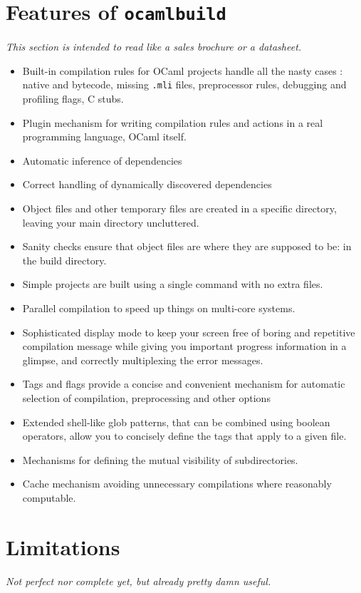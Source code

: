 \documentclass[12pt]{article}
\newcommand{\ocb}{\texttt{ocamlbuild}~}
\begin{document}
\section{Features of \ocb}
{\em This section is intended to read like a sales brochure or a datasheet.}

\begin{itemize}
\item Built-in compilation rules for OCaml projects handle all the nasty cases : native and bytecode,
missing \texttt{.mli} files, preprocessor rules, debugging and profiling flags, C stubs.
\item Plugin mechanism for writing compilation rules and actions in a real programming language,
OCaml itself.
\item Automatic inference of dependencies
\item Correct handling of dynamically discovered dependencies
\item Object files and other temporary files are created in a specific directory, leaving your main directory uncluttered.  
\item Sanity checks ensure that object files are where they are supposed to be: in the build directory.
\item Simple projects are built using a single command with no extra files.
\item Parallel compilation to speed up things on multi-core systems.
\item Sophisticated display mode to keep your screen free of boring and repetitive compilation message
while giving you important progress information in a glimpse, and correctly multiplexing the error messages.
\item Tags and flags provide a concise and convenient mechanism for automatic selection of compilation, preprocessing and
other options
\item Extended shell-like glob patterns, that can be combined using boolean operators,
allow you to concisely define the tags that apply to a given file.
\item Mechanisms for defining the mutual visibility of subdirectories.
\item Cache mechanism avoiding unnecessary compilations where reasonably computable.
\end{itemize}
\section{Limitations}
{\em Not perfect nor complete yet, but already pretty damn useful.}
\end{document}
